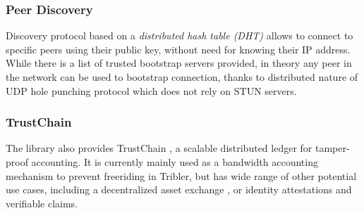 \subsubsection{Peer Discovery}
Discovery protocol based on a \textit{distributed hash table (DHT)} allows to connect to specific peers using their public key, without need for knowing their IP address. While there is a list of trusted bootstrap servers provided, in theory any peer in the network can be used to bootstrap connection, thanks to distributed nature of UDP hole punching protocol which does not rely on STUN servers.

\subsubsection{TrustChain}
The library also provides TrustChain \cite{trustchain}, a scalable distributed ledger for tamper-proof accounting. It is currently mainly used as a bandwidth accounting mechanism to prevent freeriding in Tribler, but has wide range of other potential use cases, including a decentralized asset exchange \cite{anydex}, or identity attestations and verifiable claims.




